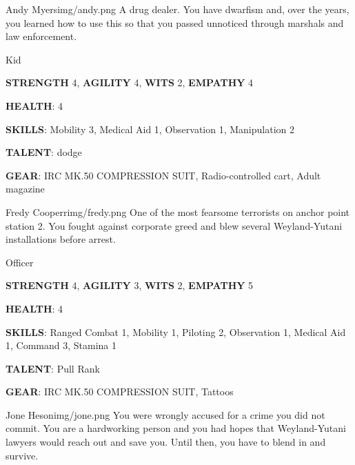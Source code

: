 
\begin{rpg-pcbox}{Andy Myers}{img/andy.png}
    A drug dealer. You have dwarfism and, over the years, you learned how to use this so that you passed unnoticed through marshals and law enforcement. 
\end{rpg-pcbox}

\begin{rpg-commentbox}{}
    Kid

    \textbf{STRENGTH} 4, \textbf{AGILITY} 4, \textbf{WITS} 2, \textbf{EMPATHY} 4

    \textbf{HEALTH}: 4

    \textbf{SKILLS}: Mobility 3, Medical Aid 1, Observation 1, Manipulation 2
    
    \textbf{TALENT}: dodge
    
    \textbf{GEAR}: IRC MK.50 COMPRESSION SUIT, Radio-controlled cart, Adult magazine
\end{rpg-commentbox}

\newsect

\medskip \medskip \medskip \medskip \medskip \medskip \medskip \medskip \medskip \medskip \medskip \medskip \medskip \medskip \medskip \medskip \medskip \medskip

\begin{rpg-pcbox}{Fredy Cooperr}{img/fredy.png}
    One of the most fearsome terrorists on anchor point station 2. You fought against corporate greed and blew several Weyland-Yutani installations before arrest. 
\end{rpg-pcbox}

\begin{rpg-commentbox}{}
    Officer

    \textbf{STRENGTH} 4, \textbf{AGILITY} 3, \textbf{WITS} 2, \textbf{EMPATHY} 5

    \textbf{HEALTH}: 4

    \textbf{SKILLS}: Ranged Combat 1, Mobility 1, Piloting 2, Observation 1, Medical Aid 1, Command 3, Stamina 1
    
    \textbf{TALENT}: Pull Rank
    
    \textbf{GEAR}: IRC MK.50 COMPRESSION SUIT, Tattoos
\end{rpg-commentbox}

\newsect

\begin{rpg-pcbox}{Jone Heson}{img/jone.png}
    You were wrongly accused for a crime you did not commit. You are a hardworking person and you had hopes that Weyland-Yutani lawyers would reach out and save you. Until then, you have to blend in and survive.
\end{rpg-pcbox}

